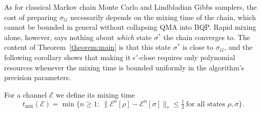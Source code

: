 As for classical Markov chain Monte Carlo and Lindbladian Gibbs samplers, the cost of preparing $\sigma_G$ necessarily depends on the mixing time of the chain, which cannot be bounded in general without collapsing QMA into BQP. Rapid mixing alone, however, says nothing about \emph{which} state $\sigma^*$ the chain converges to. The content of Theorem~\ref{theorem:main} is that this state $\sigma^*$ is close to $\sigma_G$, and the following corollary shows that making it $\epsilon'$-close requires only polynomial resources whenever the mixing time is bounded uniformly in the algorithm's precision parameters.

For a channel $\mathcal{E}$ we define its mixing time
\begin{equation}
    t_{\mathrm{mix}}(\mathcal{E})=\min\Big\{n\geq1:\ \|\mathcal{E}^n[\rho]-\mathcal{E}^n[\sigma]\|_*\leq\tfrac12\ \text{for all states }\rho,\sigma\Big\}.
\end{equation}

